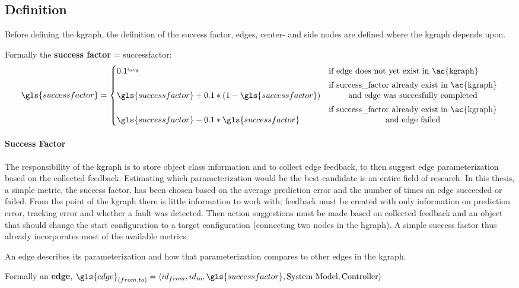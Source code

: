 \subsection{Definition}%
\label{subsec:kgraph_definition}
Before defining the \ac{kgraph}, the definition of the success factor, edges, center- and side nodes are defined where the \ac{kgraph} depends upon.\bs

Formally the \textbf{success factor} = \gls{successfactor}: 
\[\gls{successfactor} = 
  \begin{cases} 0.1^{\epsilon_{\textrm {avg}}}& \textrm {if edge does not yet exist in \ac{kgraph}}\\[5px]
    \gls{successfactor} + 0.1*(1-\gls{successfactor}) & \textrm{\shortstack{if success\_factor already exist in \ac{kgraph}\\ and edge was succesfully completed}}\\[5px]
  \gls{successfactor} - 0.1*\gls{successfactor} & \textrm{\shortstack{if success\_factor already exist in \ac{kgraph}\\ and edge failed}}
\end{cases}\]

\paragraph{Success Factor} The responsibility of the \ac{kgraph} is to store object class information and to collect edge feedback, to then suggest edge parameterization based on the collected feedback. Estimating which parameterization would be the best candidate is an entire field of research. In this thesis, a simple metric, the success factor, has been chosen based on the average prediction error and the number of times an edge succeeded or failed. From the point of the \ac{kgraph} there is little information to work with; feedback must be created with only information on prediction error, tracking error and whether a fault was detected. Then action suggestions must be made based on collected feedback and an object that should change the start configuration to a target configuration (connecting two nodes in the \ac{hgraph}). A simple success factor thus already incorporates most of the available metrics.\bs

\noindent An edge describes its parameterization and how that parameterization compares to other edges in the \ac{kgraph}.\bs

Formally an \textbf{edge}, $\gls{edge}_{(from, to)} = \left\langle id_{from}, id_{to}, \gls{successfactor}, \textrm{System Model}, \textrm{Controller}\right\rangle$\bs

